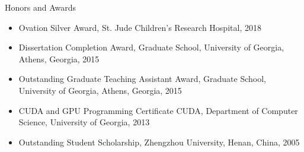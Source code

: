 \documentclass{resume} %
\begin{document}

\begin{rSection}{Honors and Awards}
\begin{itemize}
\item Ovation Silver Award, St. Jude Children’s Research Hospital, 2018
\item Dissertation Completion Award, Graduate School, University of Georgia, Athens, Georgia, 2015
\item Outstanding Graduate Teaching Assistant Award,  Graduate School, University of Georgia, Athens, Georgia, 2015
\item CUDA and GPU Programming Certificate CUDA, Department of Computer Science, University of Georgia, 2013
\item Outstanding Student Scholarship, Zhengzhou University, Henan, China, 2005
\end{itemize}
\end{rSection}
\end{document}
